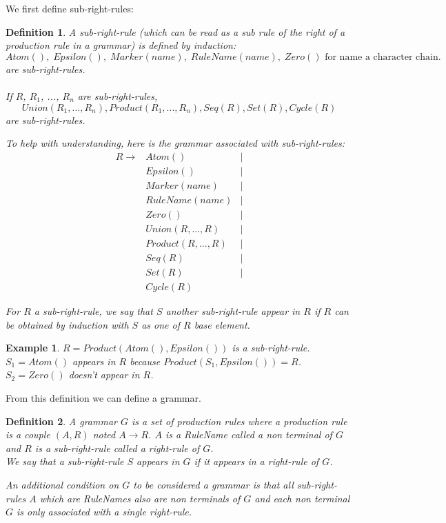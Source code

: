 \documentclass{article}
\newtheorem{example}{Example}
\newtheorem{definition}{Definition}
\begin{document}
We first define sub-right-rules:
\begin{definition}
A sub-right-rule (which can be read as a sub rule of the right of a production rule in a grammar) is defined by induction:
$$Atom(),\;Epsilon(),\;Marker(name),\;RuleName(name),\;Zero() \text{    for name a character chain.}$$
are sub-right-rules.
\\\\
If $R$, $R_1$, ..., $R_n$ are sub-right-rules,
$$Union(R_1, ..., R_n), Product(R_1, ..., R_n), Seq(R), Set(R), Cycle(R)$$
are sub-right-rules.

To help with understanding, here is the grammar associated with sub-right-rules:
\begin{align*}
R \rightarrow &Atom() &|\\
&Epsilon() &|\\
&Marker(name) &|\\
&RuleName(name) &|\\
&Zero() &|\\
&Union(R, ..., R) &|\\
&Product(R, ..., R) &|\\
&Seq(R) &|\\
&Set(R) &|\\
&Cycle(R)
\end{align*}

For $R$ a sub-right-rule, we say that $S$ another sub-right-rule appear in $R$ if $R$ can be obtained by induction with $S$ as one of $R$ base element.
\end{definition}

\begin{example}
$R = Product(Atom(), Epsilon())$ is a sub-right-rule.
\\
$S_1 = Atom()$ appears in $R$ because $Product(S_1, Epsilon()) = R$.
\\
$S_2 = Zero()$ doesn't appear in $R$.
\end{example}

From this definition we can define a grammar.
\begin{definition}
A grammar $G$ is a set of production rules where a production rule is a couple $(A, R)$ noted $A \rightarrow R$. $A$ is a RuleName called a non terminal of $G$ and $R$ is a sub-right-rule called a right-rule of $G$.
\\
We say that a sub-right-rule $S$ appears in $G$ if it appears in a right-rule of $G$.

An additional condition on $G$ to be considered a grammar is that all sub-right-rules $A$ which are RuleNames also are non terminals of $G$ and each non terminal $G$ is only associated with a single right-rule.
\end{definition}
\end{document}
